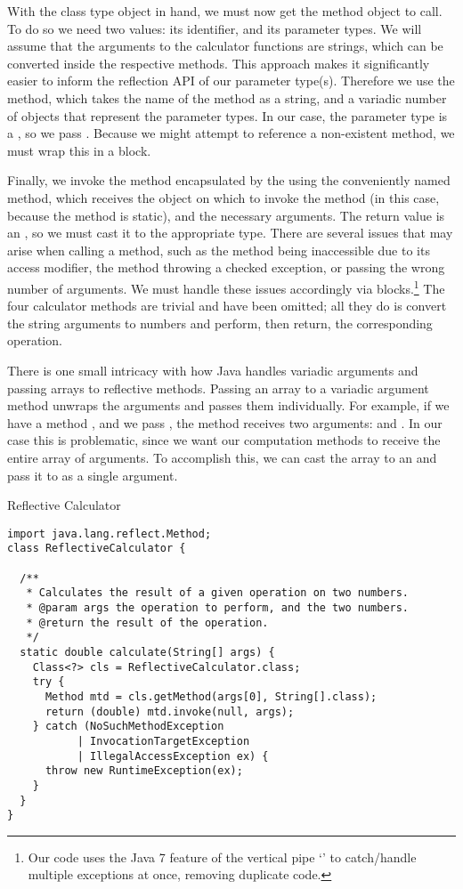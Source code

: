 With the class type object in hand, we must now get the method object to call. To do so we need two values: its identifier, and its parameter types. We will assume that the arguments to the calculator functions are strings, which can be converted inside the respective methods. This approach makes it significantly easier to inform the reflection API of our parameter type(s). Therefore we use the  method, which takes the name of the method as a string, and a variadic number of  objects that represent the parameter types. In our case, the parameter type is a , so we pass . Because we might attempt to reference a non-existent method, we must wrap this in a  block.

Finally, we invoke the method encapsulated by the  using the conveniently named  method, which receives the object on which to invoke the method (in this case,  because the method is static), and the necessary arguments. The return value is an , so we must cast it to the appropriate type. There are several issues that may arise when calling a method, such as the method being inaccessible due to its access modifier, the method throwing a checked exception, or passing the wrong number of arguments. We must handle these issues accordingly via  blocks.\footnote{Our code uses the Java 7 feature of the vertical pipe `\ttt{|}' to catch/handle multiple exceptions at once, removing duplicate code.} The four calculator methods are trivial and have been omitted; all they do is convert the string arguments to numbers and perform, then return, the corresponding operation.

There is one small intricacy with how Java handles variadic arguments and passing arrays to reflective methods. Passing an array to a variadic argument method unwraps the arguments and passes them individually. For example, if we have a method , and we pass , the method receives two arguments:  and . In our case this is problematic, since we want our computation methods to receive the entire array of arguments. To accomplish this, we can cast the array to an  and pass it to  as a single argument.

\begin{cl}[]{Reflective Calculator}
\begin{lstlisting}[language=MyJava]
import java.lang.reflect.Method;
class ReflectiveCalculator {

  /**
   * Calculates the result of a given operation on two numbers.
   * @param args the operation to perform, and the two numbers.
   * @return the result of the operation.
   */
  static double calculate(String[] args) {
    Class<?> cls = ReflectiveCalculator.class;
    try {
      Method mtd = cls.getMethod(args[0], String[].class);
      return (double) mtd.invoke(null, args);
    } catch (NoSuchMethodException
           | InvocationTargetException
           | IllegalAccessException ex) {
      throw new RuntimeException(ex);
    }
  }
}
\end{lstlisting}
\end{cl}

